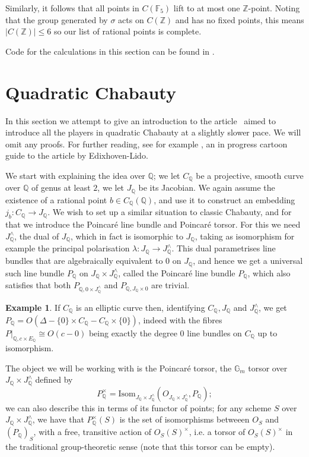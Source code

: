 \documentclass[12pt]{article}
\newcommand{\Z}{\mathbb{Z}}
\renewcommand{\G}{\mathbb{G}}
\newcommand{\Q}{\mathbb{Q}}
\newcommand{\F}{\mathbb{F}}
\theoremstyle{plain}
\theoremstyle{definition}
\newtheorem{exmp}[thm]{Example} %
\theoremstyle{remark}
\begin{document}
Similarly, it follows that all points in $C(\F_5)$ lift to at most one $\Z$-point. Noting that the group generated by $\sigma$ acts on $C(\Z)$ and has no fixed points, this means $|C(\Z)| \leq 6$ so our list of rational points is complete.

Code for the calculations in this section can be found in \cite{spelier2020}.

\section{Quadratic Chabauty}
\label{section:quadratic}
In this section we attempt to give an introduction to the article~\cite{edixhoven20} aimed to introduce all the players in quadratic Chabauty at a slightly slower pace. We will omit any proofs. For further reading, see for example \cite{hashimoto20}, an in progress cartoon guide to the article by Edixhoven-Lido.

We start with explaining the idea over $\Q$; we let $C_\Q$ be a projective, smooth curve over $\Q$ of genus at least $2$, we let $J_\Q$ be its Jacobian. We again assume the existence of a rational point $b \in C_\Q(\Q)$, and use it to construct an embedding $j_b : C_\Q \to J_\Q$. We wish to set up a similar situation to classic Chabauty, and for that we introduce the Poincar\'e line bundle and Poincar\'e torsor. For this we need $J_\Q^\wedge$, the dual of $J_\Q$, which in fact is isomorphic to $J_\Q$, taking as isomorphism for example the principal polarisation $\lambda: J_\Q \to J_\Q^\wedge$. This dual parametrises line bundles that are algebraically equivalent to $0$ on $J_\Q$, and hence we get a universal such line bundle $P_\Q$ on $J_\Q \times J_\Q^\wedge$, called the Poincar\'e line bundle $P_\Q$, which also satisfies that both $P_{\Q,0\times J_\Q^\wedge}$ and $P_{\Q,J_\Q \times 0}$ are trivial.

\begin{exmp}
If $C_\Q$ is an elliptic curve then, identifying $C_\Q,J_\Q$ and $J_\Q^{\wedge}$, we get $P_\Q = O(\Delta-\{0\} \times C_\Q - C_\Q \times \{0\})$, indeed with the fibres $P|_{\Q,c \times E_\Q} \cong O(c-0)$ being exactly the degree $0$ line bundles on $C_\Q$ up to isomorphism.
\end{exmp}

The object we will be working with is the Poincar\'e torsor, the $\G_m$ torsor over $J_\Q \times J_\Q^\wedge$ defined by \[
P_\Q^\times = \text{Isom}_{J_\Q \times J^\wedge_\Q}(O_{J_\Q \times J^\wedge_\Q},P_\Q);
\] 
we can also describe this in terms of its functor of points; for any scheme $S$ over $J_\Q \times J^\wedge_\Q$, we have that $P^\times_\Q(S)$ is the set of isomorphisms betweeen $O_S$ and $(P_\Q)_S$, with a free, transitive action of $O_S(S)^\times$, i.e. a torsor of $O_S(S)^\times$ in the traditional group-theoretic sense (note that this torsor can be empty).
\end{document}
